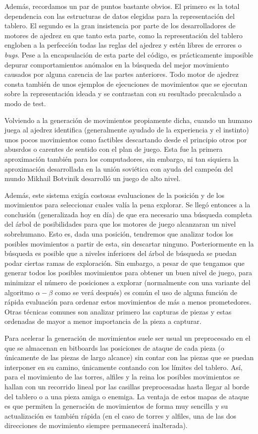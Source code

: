 \documentclass[letterpaper,12pt]{article}
\begin{document}
Además, recordamos un par de puntos bastante obvios. El primero es la total 
dependencia con las estructuras de datos elegidas para la representación del tablero.
El segundo es la gran insistencia por parte de los desarrolladores de motores de 
ajedrez en que tanto esta parte, como la representación del tablero engloben a la 
perfección todas las reglas del ajedrez y estén libres de errores o \textit{bugs}.
Pese a la encapsulación de esta parte del código, es prácticamente imposible depurar
comportamientos anómalos en la búsqueda del mejor movimiento causados por alguna carencia
de las partes anteriores. Todo motor de ajedrez consta también de unos ejemplos de 
ejecuciones de movimientos que se ejecutan sobre la representación ideada y se contrastan 
con su resultado precalculado a modo de test.

Volviendo a la generación de movimientos propiamente dicha, cuando un humano juega al 
ajedrez identifica (generalmente ayudado de la experiencia y el instinto) unos pocos 
movimientos como factibles descartando desde el principio otros por abusrdos o carentes 
de sentido con el plan de juego. Esta fue la primera aproximación también para los
computadores, sin embargo, ni tan siquiera la aproximación desarrollada en la unión 
soviética con ayuda del campeón del mundo Mikhail Botvinik desarrolló un juego de alto
nivel. 

Además, este sistema exigía costosas evaluaciones de la posición y de los movimientos 
para seleccionar cuales valía la pena explorar. Se llegó entonces a la conclusión 
(generalizada hoy en día) de que era necesario una búsqueda completa del árbol de 
posibilidades para que los motores de juego alcanzaran un nivel sobrehumano. Esto es,
dada una posición, tendremos que analizar todos los posibles movimientos a partir de
esta, sin descartar ninguno. Posteriormente en la búsqueda es posible que a niveles
inferiores del árbol de búsqueda se puedan podar ciertas ramas de exploración. 
Sin embargo, a pesar de que tengamos que generar todos los posibles movimientos para
obtener un buen nivel de juego, para minimizar el número de posiciones a explorar 
(normalmente con una variante del algoritmo $\alpha - \beta$ como se verá después) es
común el uso de alguna función de rápida evaluación para ordenar estos movimientos
de más a menos prometedores. Otras técnicas comunes son analizar primero las capturas
de piezas y estas ordenadas de mayor a menor importancia de la pieza a capturar.

Para acelerar la generación de movimientos suele ser usual un preprocesado en el que 
se almacenan en bitboards las posiciones de ataque de cada pieza (o únicamente de las
piezas de largo alcance) sin contar con las piezas que se puedan interponer en su camino,
únicamente contando con los límites del tablero. Así, para el movimiento de las torres,
alfiles y la reina los posibles movimientos se hallan con un recorrido lineal por las
casillas preprocesadas hasta llegar al borde del tablero o a una pieza amiga o enemiga. 
La ventaja de estos mapas de ataque es que permiten la generación de movimientos de 
forma muy sencilla y su actualización es también rápida (en el caso de torres y alfiles,
una de las dos direcciones de movimiento siempre permanecerá inalterada).
\end{document}
